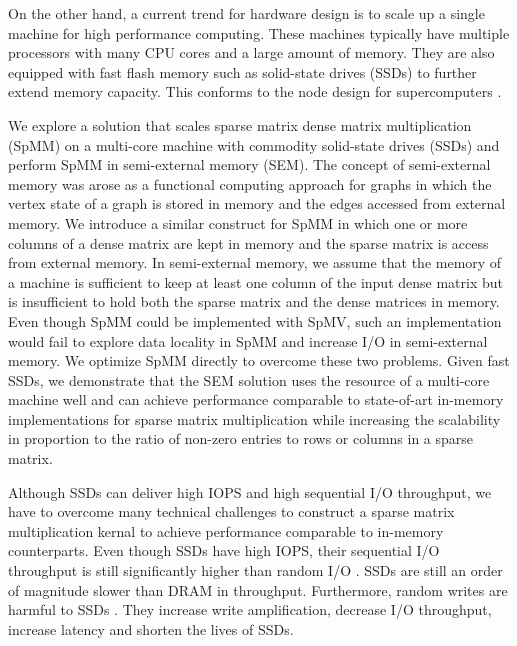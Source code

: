 
On the other hand, a current trend for hardware design is to scale up
a single machine for high performance computing.
These machines typically have multiple processors with many CPU cores and
a large amount of memory. They are also equipped with fast flash
memory such as solid-state drives (SSDs) to further extend memory capacity.
This conforms to the node design for supercomputers \cite{Ang14}.

We explore a solution that scales sparse matrix dense matrix multiplication
(SpMM) on a multi-core machine with commodity solid-state drives (SSDs) and
perform SpMM in semi-external memory (SEM). The concept of semi-external memory
was arose as a functional computing approach for graphs \cite{Abello98} in which
the vertex state of a graph is stored in memory and the edges accessed from
external memory. We introduce a similar construct for SpMM in which one or more
columns of a dense matrix are kept in memory and the sparse matrix is access
from external memory. In semi-external memory, we assume
that the memory of a machine is sufficient to keep at least one column
of the input dense matrix but is insufficient to hold both the sparse matrix
and the dense matrices in memory. Even though SpMM could be implemented with
SpMV, such an implementation would fail to explore data locality in SpMM and
increase I/O in semi-external memory. We optimize SpMM directly to overcome
these two problems. Given fast SSDs, we demonstrate that the SEM solution
uses the resource of a multi-core machine well and
can achieve performance comparable to state-of-art in-memory implementations
for sparse matrix multiplication while increasing the scalability in proportion
to the ratio of non-zero entries to rows or columns in a sparse matrix.


Although SSDs can deliver high IOPS and high sequential I/O throughput, we have
to overcome many technical challenges to construct a sparse matrix
multiplication kernal to achieve performance comparable to in-memory
counterparts. Even though SSDs have high IOPS, their sequential I/O throughput is
still significantly higher than random I/O \cite{safs}. SSDs are still an order of
magnitude slower than DRAM in throughput. Furthermore, random writes are harmful
to SSDs \cite{sfs}. They increase write amplification, decrease I/O throughput,
increase latency and shorten the lives of SSDs.

